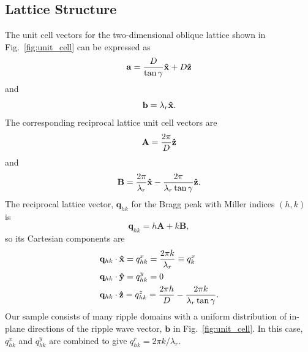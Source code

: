 \subsection{Lattice Structure}\label{sec:lattice_structure}
The unit cell vectors for the two-dimensional oblique lattice shown in Fig.~\ref{fig:unit_cell}
can be expressed as 
\begin{equation}
  \mathbf{a} = \frac{D}{\tan\gamma}\mathbf{\hat{x}} + D\mathbf{\hat{z}}
\end{equation}
and
\begin{equation}
  \mathbf{b} = \lambda_r\mathbf{\hat{x}}.
\end{equation}
The corresponding reciprocal lattice unit cell vectors are
\begin{equation}
  \mathbf{A} = \frac{2\pi}{D}\mathbf{\hat{z}}
\end{equation}
and
\begin{equation}
  \mathbf{B} = \frac{2\pi}{\lambda_r}\mathbf{\hat{x}} - \frac{2\pi}{\lambda_r\tan\gamma}\mathbf{\hat{z}}.
\end{equation}
The reciprocal lattice vector, $\mathbf{q}_{hk}$ for the Bragg peak with 
Miller indices $(h,k)$ is 
\begin{equation}
  \mathbf{q}_{hk}=h\mathbf{A}+k\mathbf{B},
\end{equation}
so its Cartesian components are
\begin{align}
  & \mathbf{q}_{hk}\cdot\mathbf{\hat{x}} = q_{hk}^x = \frac{2\pi k}{\lambda_r} \equiv q_{k}^x \\
  & \mathbf{q}_{hk}\cdot\mathbf{\hat{y}} = q_{hk}^y = 0 \\
  & \mathbf{q}_{hk}\cdot\mathbf{\hat{z}} = q_{hk}^z = \frac{2\pi h}{D} - \frac{2\pi k}{\lambda_r\tan\gamma}.
\end{align}
Our sample consists of many ripple domains with a uniform distribution of in-plane directions of the
ripple wave vector, $\mathbf{b}$ in Fig.~\ref{fig:unit_cell}. 
In this case, $q_{hk}^x$ and $q_{hk}^y$ are combined to 
give $q_{hk}^r = 2\pi k/\lambda_r$.

